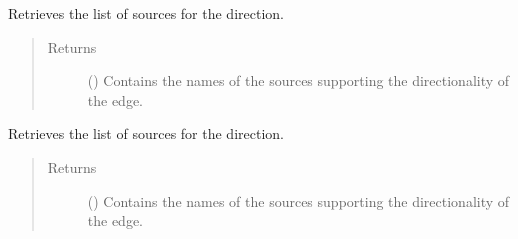 \documentclass[letterpaper,10pt,english]{sphinxmanual}
\begin{document}
\begin{fulllineitems}
\begin{fulllineitems}
\begin{quote}
\begin{description}
\begin{itemize}
\end{itemize}

\end{description}\end{quote}

\end{fulllineitems}


\begin{fulllineitems}
\label{\detokenize{reference:pypath.main.Direction.sources_reverse}}
Retrieves the list of sources for the  direction.
\begin{quote}\begin{description}
\item[{Returns}] \leavevmode
() \textendash{} Contains the names of the sources supporting the
 directionality of the edge.

\end{description}\end{quote}

\end{fulllineitems}


\begin{fulllineitems}
\label{\detokenize{reference:pypath.main.Direction.sources_straight}}
Retrieves the list of sources for the 
direction.
\begin{quote}\begin{description}
\item[{Returns}] \leavevmode
() \textendash{} Contains the names of the sources supporting the
 directionality of the edge.

\end{description}\end{quote}

\end{fulllineitems}



\end{fulllineitems}
\end{document}
